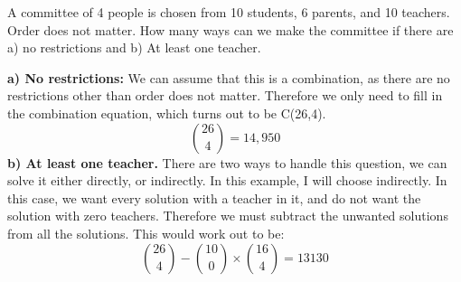             \begin{example}
                A committee of 4 people is chosen from 10 students, 6 parents, and 10 teachers. Order does not matter. How many ways can we make the committee if there are a) no restrictions and b) At least one teacher.
            \end{example}
                \textbf{a) No restrictions:}
                 We can assume that this is a combination, as there are no restrictions other than order does not matter. Therefore we only need to fill in the combination equation, which turns out to be C(26,4). 
                 $$\binom{26}{4} = 14,950$$
                 \textbf{b) At least one teacher.}
                 There are two ways to handle this question, we can solve it either directly, or indirectly. In this example, I will choose indirectly. In this case, we want every solution with a teacher in it, and do not want the solution with zero teachers. Therefore we must subtract the unwanted solutions from all the solutions. This would work out to be:
                 $$\binom{26}{4} - \binom{10}{0}\times\binom{16}{4} = 13130$$
        